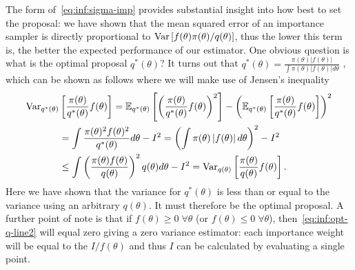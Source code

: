 The form of~\eqref{eq:inf:sigma-imp} provides substantial insight into how
best to set the proposal: we have shown that the mean squared error of an
importance sampler is directly proportional to $\mathrm{Var} \left[f(\theta)\pi(\theta)/q(\theta)\right]$,
thus the lower this term is, the better the expected performance of our
estimator.  One obvious question is what is the optimal proposal $q^*(\theta)$?
It turns out that $q^*(\theta) = \frac{\pi(\theta)\left|f(\theta)\right|}
{\int \pi(\theta)\left|f(\theta)\right|d\theta}$
\citep{kahn1953methods,owen2013mc}, which can be
 shown as follows where we will make use of Jensen's inequality
\begin{align}
\mathrm{Var}_{q^*(\theta)} &\left[\frac{\pi(\theta)}{q^*(\theta)} f(\theta)\right] =
\mathbb{E}_{q^*(\theta)} \left[\left(\frac{\pi(\theta)}{q^*(\theta)} f(\theta)\right)^2\right]
-\left(\mathbb{E}_{q^*(\theta)} \left[\frac{\pi(\theta)}{q^*(\theta)} f(\theta)\right]\right)^2
\nonumber \\
 &= \int \frac{\pi(\theta)^2 f(\theta)^2}{q^*(\theta)} d\theta
 -I^2 
 = \left(\int \pi(\theta) \left|f(\theta)\right| d\theta\right)^2
 -I^2 \label{eq:inf:opt-q-line2}\\
 &\le \int \left(\frac{\pi(\theta) f(\theta)}{q(\theta)}\right)^2 q(\theta) d\theta
 -I^2 =\mathrm{Var}_{q(\theta)} \left[\frac{\pi(\theta)}{q(\theta)} f(\theta)\right] \label{eq:inf:opt-q}.
\end{align}
Here we have shown that the variance for $q^*(\theta)$ is less than or equal to the variance
using an arbitrary $q(\theta)$.  It must therefore be the optimal proposal.
A further point of note is that if $f(\theta)\ge0 \; \forall \theta$ (or 
$f(\theta)\le0 \; \forall \theta$), 
then~\eqref{eq:inf:opt-q-line2} will equal zero giving a zero variance estimator:
each importance weight will be equal to the  $I/f(\theta)$ and thus $I$
can be calculated by evaluating a single point.  


